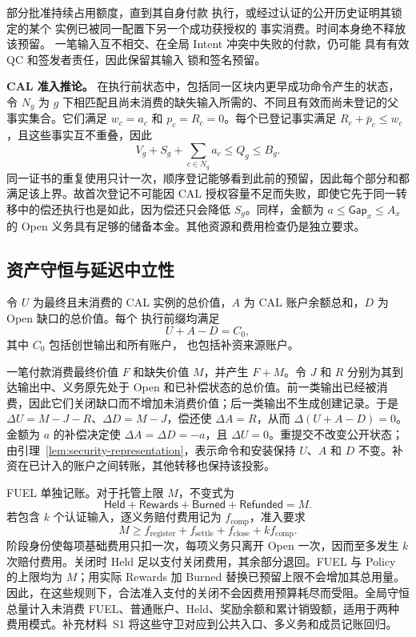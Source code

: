 部分批准持续占用额度，直到其自身付款
执行，或经过认证的公开历史证明其锁定的某个
实例已被同一配置下另一个成功获授权的
事实消费。时间本身绝不释放该预留。
一笔输入互不相交、在全局 Intent 冲突中失败的付款，仍可能
具有有效 QC 和签发者责任，因此保留其输入
锁和签名预留。

\noindent\textbf{CAL 准入推论。}
在执行前状态中，包括同一区块内更早成功命令产生的状态，令 $N_g$ 为 $g$ 下相匹配且尚未消费的缺失输入所需的、不同且有效而尚未登记的父事实集合。它们满足 $w_c=a_c$ 和 $p_c=R_c=0$。每个已登记事实满足 $R_c+\bar p_c\le w_c$，且这些事实互不重叠，因此
\begin{equation}
 V_g+S_g+\sum_{c\in N_g}a_c\le Q_g\le B_g.
 \label{eq:security-admission}
\end{equation}
同一证书的重复使用只计一次，顺序登记能够看到此前的预留，因此每个部分和都满足该上界。故首次登记不可能因 CAL 授权容量不足而失败，即使它先于同一转移中的偿还执行也是如此，因为偿还只会降低 $S_g$。同样，金额为 $a\le\mathsf{Gap}_x\le A_x$ 的 Open 义务具有足够的储备本金。其他资源和费用检查仍是独立要求。

\subsection{资产守恒与延迟中立性}
\label{sec:security-conservation}

\begin{theorem}[CAL 守恒]
\label{thm:security-conservation}
令 $U$ 为最终且未消费的 CAL 实例的总价值，$A$ 为
CAL 账户余额总和，$D$ 为 Open 缺口的总价值。每个
执行前缀均满足
\begin{equation}
 U+A-D=C_0,
 \label{eq:security-conservation}
\end{equation}
其中 $C_0$ 包括创世输出和所有账户，
也包括补资来源账户。
\end{theorem}
\begin{IEEEproof}
一笔付款消费最终价值 $F$ 和缺失价值 $M$，并产生 $F+M$。令 $J$ 和 $R$ 分别为其到达输出中、义务原先处于 Open 和已补偿状态的总价值。前一类输出已经被消费，因此它们关闭缺口而不增加未消费价值；后一类输出不生成创建记录。于是 $\Delta U=M-J-R$、$\Delta D=M-J$，偿还使 $\Delta A=R$，从而 $\Delta(U+A-D)=0$。金额为 $a$ 的补偿决定使 $\Delta A=\Delta D=-a$，且 $\Delta U=0$。重提交不改变公开状态；由引理~\ref{lem:security-representation}，表示命令和安装保持 $U$、$A$ 和 $D$ 不变。补资在已计入的账户之间转账，其他转移也保持该投影。
\end{IEEEproof}

FUEL 单独记账。对于托管上限 $M$，不变式为
\[
 \mathsf{Held}+\mathsf{Rewards}+\mathsf{Burned}+\mathsf{Refunded}=M.
\]
若包含 $k$ 个认证输入，逐义务赔付费用记为 $f_{\mathrm{comp}}$，准入要求
\[
 M\ge f_{\mathrm{register}}+f_{\mathrm{settle}}+f_{\mathrm{close}}
       +k f_{\mathrm{comp}}.
\]
阶段身份使每项基础费用只扣一次，每项义务只离开 Open 一次，因而至多发生 $k$ 次赔付费用。关闭时 Held 足以支付关闭费用，其余部分退回。FUEL 与 Policy 的上限均为 $M$；用实际 Rewards 加 Burned 替换已预留上限不会增加其总用量。因此，在这些规则下，合法准入支付的关闭不会因费用预算耗尽而受阻。全局守恒总量计入未消费 FUEL、普通账户、Held、奖励余额和累计销毁额，适用于两种费用模式。补充材料~S1 将这些守卫对应到公共入口、多义务和成员记账回归。

